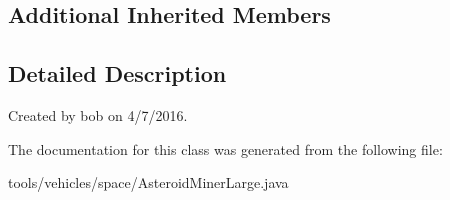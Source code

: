 \subsection*{Additional Inherited Members}


\subsection{Detailed Description}
Created by bob on 4/7/2016. 

The documentation for this class was generated from the following file\+:\begin{DoxyCompactItemize}
\item 
tools/vehicles/space/Asteroid\+Miner\+Large.\+java\end{DoxyCompactItemize}
